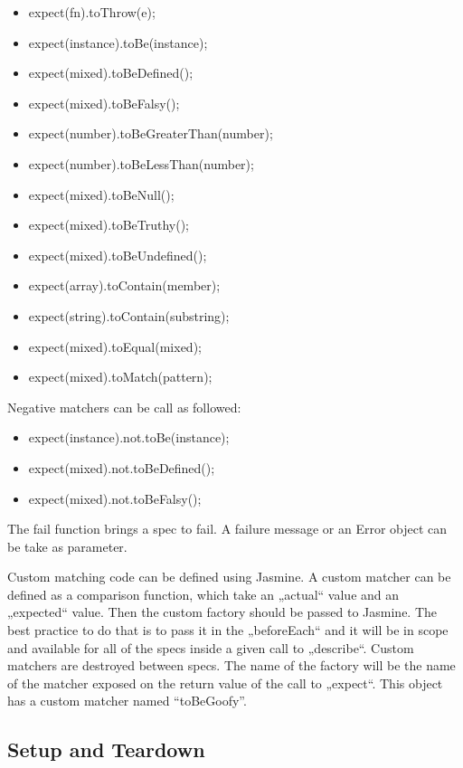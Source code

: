 \documentclass[11pt]{article}
\begin{document}
\begin{itemize}
\item expect(fn).toThrow(e);
\item expect(instance).toBe(instance);
\item expect(mixed).toBeDefined();
\item expect(mixed).toBeFalsy();
\item expect(number).toBeGreaterThan(number);
\item expect(number).toBeLessThan(number);
\item expect(mixed).toBeNull();
\item expect(mixed).toBeTruthy();
\item expect(mixed).toBeUndefined();
\item expect(array).toContain(member);
\item expect(string).toContain(substring);
\item expect(mixed).toEqual(mixed);
\item expect(mixed).toMatch(pattern);
\end{itemize}

Negative matchers can be call as followed:

\begin{itemize}
\item expect(instance).not.toBe(instance);
\item expect(mixed).not.toBeDefined();
\item expect(mixed).not.toBeFalsy();
\end{itemize}

The fail function brings a spec to fail. A failure message or an Error object can be take as parameter.

Custom matching code can be defined using Jasmine. A custom matcher can be defined as a comparison function, which take an „actual“ value and an „expected“ value. Then the custom factory should be passed to Jasmine. The best practice to do that is to pass it in the „beforeEach“ and it will be in scope and available for all of the specs inside a given call to „describe“. Custom matchers are destroyed between specs. The name of the factory will be the name of the matcher exposed on the return value of the call to „expect“. This object has a custom matcher named “toBeGoofy”. 

\subsection{Setup and Teardown}
\end{document}
